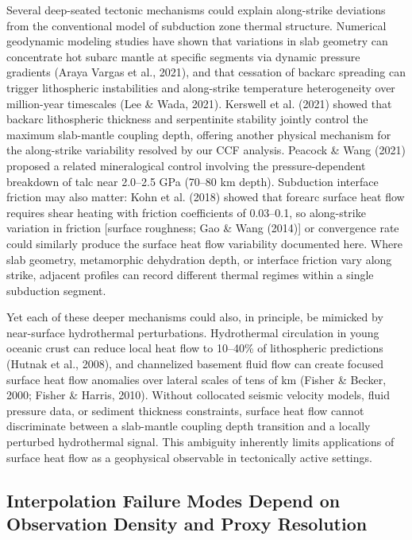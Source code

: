 \documentclass[draft,linenumbers]{agujournal2019}
\begin{document}
Several deep-seated tectonic mechanisms could explain along-strike
deviations from the conventional model of subduction zone thermal
structure. Numerical geodynamic modeling studies have shown that
variations in slab geometry can concentrate hot subarc mantle at
specific segments via dynamic pressure gradients (Araya Vargas et al.,
2021), and that cessation of backarc spreading can trigger lithospheric
instabilities and along-strike temperature heterogeneity over
million-year timescales (Lee \& Wada, 2021). Kerswell et al. (2021)
showed that backarc lithospheric thickness and serpentinite stability
jointly control the maximum slab-mantle coupling depth, offering another
physical mechanism for the along-strike variability resolved by our CCF
analysis. Peacock \& Wang (2021) proposed a related mineralogical
control involving the pressure-dependent breakdown of talc near 2.0--2.5
GPa (70--80 km depth). Subduction interface friction may also matter:
Kohn et al. (2018) showed that forearc surface heat flow requires shear
heating with friction coefficients of 0.03--0.1, so along-strike
variation in friction {[}surface roughness; Gao \& Wang (2014){]} or
convergence rate could similarly produce the surface heat flow
variability documented here. Where slab geometry, metamorphic
dehydration depth, or interface friction vary along strike, adjacent
profiles can record different thermal regimes within a single subduction
segment.

Yet each of these deeper mechanisms could also, in principle, be
mimicked by near-surface hydrothermal perturbations. Hydrothermal
circulation in young oceanic crust can reduce local heat flow to
10--40\% of lithospheric predictions (Hutnak et al., 2008), and
channelized basement fluid flow can create focused surface heat flow
anomalies over lateral scales of tens of km (Fisher \& Becker, 2000;
Fisher \& Harris, 2010). Without collocated seismic velocity models,
fluid pressure data, or sediment thickness constraints, surface heat
flow cannot discriminate between a slab-mantle coupling depth transition
and a locally perturbed hydrothermal signal. This ambiguity inherently
limits applications of surface heat flow as a geophysical observable in
tectonically active settings.

\subsection{Interpolation Failure Modes Depend on Observation Density
and Proxy
Resolution}\label{sec:interpolation-failure-modes-depend-on-observation-density-and-proxy-resolution}
\end{document}
